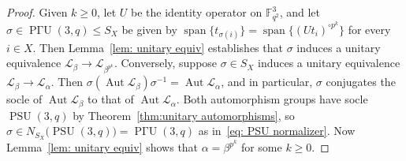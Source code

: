 \documentclass[11pt]{article}
\theoremstyle{definition}
\numberwithin{equation}{section}
\begin{document}
\begin{proof}
Given $k \geq 0$, let $U$ be the identity operator on $\mathbb{F}_{q^2}^3$, and let $\sigma \in \operatorname{P\text{$\Gamma$}U}(3,q) \leq S_X$ be given by $\operatorname{span}\{t_{\sigma(i)}\} = \operatorname{span}\{(U t_i)^{\circ p^k}\}$ for every $i \in X$.
Then Lemma~\ref{lem: unitary equiv} establishes that $\sigma$ induces a unitary equivalence $\mathscr{L}_\beta \to \mathscr{L}_{\beta^{p^k}}$.
Conversely, suppose $\sigma \in S_X$ induces a unitary equivalence $\mathscr{L}_\beta \to \mathscr{L}_\alpha$.
Then $\sigma ( \operatorname{Aut} \mathscr{L}_\beta ) \sigma^{-1} = \operatorname{Aut} \mathscr{L}_\alpha$, and in particular, $\sigma$ conjugates the socle of $\operatorname{Aut} \mathscr{L}_\beta$ to that of $\operatorname{Aut} \mathscr{L}_\alpha$.
Both automorphism groups have socle $\operatorname{PSU}(3,q)$ by Theorem~\ref{thm:unitary automorphisms}, so $\sigma \in N_{S_X}\bigl( \operatorname{PSU}(3,q) \bigr) = \operatorname{P\text{$\Gamma$}U}(3,q)$ as in~\eqref{eq: PSU normalizer}.
Now Lemma~\ref{lem: unitary equiv} shows that $\alpha = \beta^{p^k}$ for some $k \geq 0$.
\end{proof}
\end{document}
